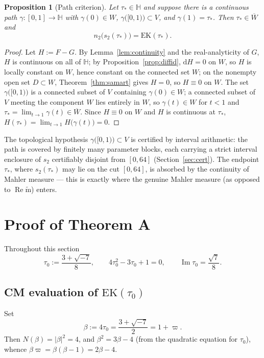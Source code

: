 \documentclass[11pt]{article}
\newtheorem{proposition}[theorem]{Proposition}
\theoremstyle{definition}
\theoremstyle{remark}
\newcommand{\Hh}{\mathbb{H}}
\newcommand{\id}{\mathrm{d}}
\newcommand{\ImT}{\operatorname{Im}}
\newcommand{\ReT}{\operatorname{Re}}
\newcommand{\m}{\mathrm{m}}
\newcommand{\mt}{\widetilde{\m}}
\begin{document}
\begin{proposition}[Path criterion]\label{prop:criterion}
Let $\tau_*\in\Hh$ and suppose there is a continuous path
$\gamma\colon[0,1]\to\Hh$ with $\gamma(0)\in W$,
$\gamma\bigl([0,1)\bigr)\subset V$, and $\gamma(1)=\tau_*$. Then
$\tau_*\in\overline{W}$ and
\[
  n_2\bigl(s_2(\tau_*)\bigr)=\mathrm{EK}(\tau_*).
\]
\end{proposition}
\begin{proof}
Let $H:=F-G$. By Lemma~\ref{lem:continuity} and the real-analyticity of
$G$, $H$ is continuous on all of $\Hh$; by Proposition~\ref{prop:diffid},
$\id H=0$ on $W$, so $H$ is locally constant on $W$, hence constant on the
connected set $W$; on the nonempty open set $D\subset W$,
Theorem~\ref{thm:samart} gives $H=0$, so $H\equiv0$ on $W$. The set
$\gamma\bigl([0,1)\bigr)$ is a connected subset of $V$ containing
$\gamma(0)\in W$; a connected subset of $V$ meeting the component $W$ lies
entirely in $W$, so $\gamma(t)\in W$ for $t<1$ and
$\tau_*=\lim_{t\to1}\gamma(t)\in\overline W$. Since $H\equiv0$ on $W$
and $H$ is continuous at $\tau_*$,
$H(\tau_*)=\lim_{t\to1}H\bigl(\gamma(t)\bigr)=0$.
\end{proof}

The topological hypothesis $\gamma\bigl([0,1)\bigr)\subset V$ is certified
by interval arithmetic: the path is covered by finitely many parameter
blocks, each carrying a strict interval enclosure of $s_2$ certifiably
disjoint from $[0,64]$ (Section~\ref{sec:cert}). The endpoint $\tau_*$,
where $s_2(\tau_*)$ may lie on the cut $[0,64]$, is absorbed by the
continuity of Mahler measure --- this is exactly where the genuine Mahler
measure (as opposed to $\ReT\mt$) enters.

\section{Proof of Theorem A}\label{sec:thmA}

Throughout this section
\[
  \tau_0:=\frac{3+\sqrt{-7}}8,\qquad
  4\tau_0^2-3\tau_0+1=0,\qquad
  \ImT\tau_0=\frac{\sqrt7}{8}.
\]

\subsection{CM evaluation of \texorpdfstring{$\mathrm{EK}(\tau_0)$}{EK(tau0)}}\label{subsec:P1A}

Set
\[
  \beta:=4\tau_0=\frac{3+\sqrt{-7}}2=1+\varpi .
\]
Then $N(\beta)=|\beta|^2=4$, and $\beta^2=3\beta-4$ (from the quadratic
equation for $\tau_0$), whence $\beta\varpi=\beta(\beta-1)=2\beta-4$.
\end{document}
